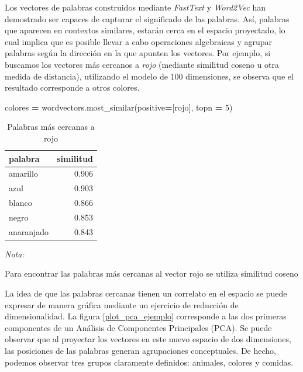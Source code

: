 \documentclass[
  12pt,
]{article}
\newenvironment{Shaded}{\begin{snugshade}}{\end{snugshade}}
\newcommand{\DecValTok}[1]{\textcolor[rgb]{0.00,0.00,0.81}{#1}}
\newcommand{\NormalTok}[1]{#1}
\newcommand{\OperatorTok}[1]{\textcolor[rgb]{0.81,0.36,0.00}{\textbf{#1}}}
\newcommand{\StringTok}[1]{\textcolor[rgb]{0.31,0.60,0.02}{#1}}
\begin{document}
Los vectores de palabras construidos mediante \emph{FastText} y
\emph{Word2Vec} han demostrado ser capaces de capturar el significado de
las palabras. Así, palabras que aparecen en contextos similares, estarán
cerca en el espacio proyectado, lo cual implica que es posible llevar a
cabo operaciones algebraicas y agrupar palabras según la dirección en la
que apunten los vectores. Por ejemplo, si buscamos los vectores más
cercanos a \emph{rojo} (mediante similitud coseno u otra medida de
distancia), utilizando el modelo de 100 dimensiones, se observa que el
resultado corresponde a otros colores.

\begin{Shaded}
\begin{Highlighting}[]
\NormalTok{colores }\OperatorTok{=}\NormalTok{  wordvectors.most\_similar(positive}\OperatorTok{=}\NormalTok{[}\StringTok{\textquotesingle{}rojo\textquotesingle{}}\NormalTok{],  topn }\OperatorTok{=} \DecValTok{5}\NormalTok{)}
\end{Highlighting}
\end{Shaded}

\begin{table}[H]

\caption{\label{tab:tabla_colores}Palabras más cercanas a rojo}
\centering
\begin{threeparttable}
\begin{tabular}[t]{lr}
\toprule
palabra & similitud\\
\midrule
amarillo & 0.906\\
azul & 0.903\\
blanco & 0.866\\
negro & 0.853\\
anaranjado & 0.843\\
\bottomrule
\end{tabular}
\begin{tablenotes}[para]
\small
\item \textit{Nota:} 
\item Para encontrar las palabras más cercanas al vector rojo se utiliza similitud coseno
\end{tablenotes}
\end{threeparttable}
\end{table}

La idea de que las palabras cercanas tienen un correlato en el espacio
se puede expresar de manera gráfica mediante un ejercicio de reducción
de dimensionalidad. La figura \ref{plot_pca_ejemplo} corresponde a las
dos primeras componentes de un Análisis de Componentes Principales
(PCA). Se puede observar que al proyectar los vectores en este nuevo
espacio de dos dimensiones, las posiciones de las palabras generan
agrupaciones conceptuales. De hecho, podemos observar tres grupos
claramente definidos: animales, colores y comidas.
\end{document}
